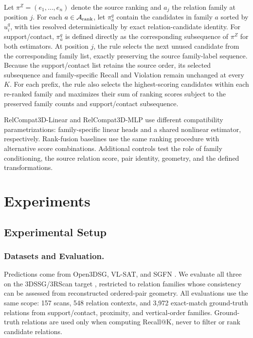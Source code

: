 Let $\pi^Z=(e_1,\ldots,e_n)$ denote the source ranking and $a_j$ the relation family at position $j$. For each $a\in\mathcal A_{\rm rank}$, let $\pi_a^q$ contain the candidates in family $a$ sorted by $u_i^q$, with ties resolved deterministically by exact relation-candidate identity. For support/contact, $\pi_a^q$ is defined
directly as the corresponding subsequence of $\pi^Z$ for both estimators. At position $j$, the rule selects the next unused candidate from the corresponding family list, exactly preserving the source family-label sequence. Because the support/contact list retains the source order, its selected subsequence and family-specific Recall and Violation remain unchanged at every $K$. For each prefix, the rule also selects the highest-scoring candidates within each re-ranked family and maximizes their sum of ranking scores subject to the preserved family counts and support/contact subsequence.

RelCompat3D-Linear and RelCompat3D-MLP use different compatibility parametrizations: family-specific linear heads and a shared nonlinear estimator, respectively. Rank-fusion baselines use the same ranking procedure with alternative score combinations. Additional controls test the role of family conditioning, the source relation score, pair identity, geometry, and the defined transformations. 


\section{Experiments}
\subsection{Experimental Setup}
\subsubsection{Datasets and Evaluation.}
Predictions come from Open3DSG, VL-SAT, and SGFN \cite{wang2023vl,koch2024open3dsg,wu2021scenegraphfusion}. We evaluate all three on the 3DSSG/3RScan target \cite{wald2019rio,wald2020learning}, restricted to relation families whose consistency can be assessed from reconstructed ordered-pair geometry. All evaluations use the same scope: 157 scans, 548 relation contexts, and 3,972 exact-match ground-truth relations from support/contact, proximity, and vertical-order families. Ground-truth relations are used only when computing Recall@K, never to filter or rank candidate relations. 

